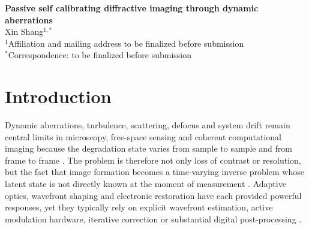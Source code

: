 \documentclass[11pt]{article}
\begin{document}
\begin{center}
{\LARGE \textbf{Passive self calibrating diffractive imaging through dynamic aberrations}}\\[1em]
{\large Xin Shang$^{1,*}$}\\[0.5em]
$^{1}$Affiliation and mailing address to be finalized before submission\\[0.5em]
$^{*}$Correspondence: to be finalized before submission
\end{center}

\begin{abstract}
Dynamic aberrations make coherent image formation a moving inverse problem because the degradation state changes during measurement rather than remaining fixed. Existing solutions often depend on active wavefront sensing, adaptive hardware, iterative correction or substantial electronic inference. Here we test a narrower question suited to a physically constrained benchmark: whether a fixed phase-only diffractive frontend can use a co-propagating pilot field to encode the instantaneous distortion state before digital reconstruction. Across mechanism-level surrogate studies, a Zernike wave-optics protocol, local information analysis, cross-task transfer checks and a first passive-processor prototype, the present evidence supports a bounded conclusion. A common-path pilot channel improves restoration relative to no-reference and mismatched-reference controls under the verified synthetic ledgers, with the strongest gain appearing in the wave-optics benchmark. The same evidence also sets a strict limit: the processor-level advantage remains weak and configuration sensitive, so the current manuscript frames the device result as a reproducible boundary case rather than a mature optical demonstration.
\end{abstract}

\section*{Introduction}
Dynamic aberrations, turbulence, scattering, defocus and system drift remain central limits in microscopy, free-space sensing and coherent computational imaging because the degradation state varies from sample to sample and from frame to frame \cite{ref1,ref2,ref3,ref4,ref5,ref6,ref7,ref8}. The problem is therefore not only loss of contrast or resolution, but the fact that image formation becomes a time-varying inverse problem whose latent state is not directly known at the moment of measurement \cite{ref7,ref8,ref9,ref10,ref11,ref12,ref13}. Adaptive optics, wavefront shaping and electronic restoration have each provided powerful responses, yet they typically rely on explicit wavefront estimation, active modulation hardware, iterative correction or substantial digital post-processing \cite{ref2,ref3,ref4,ref9,ref10,ref11,ref12,ref13}.
\end{document}
